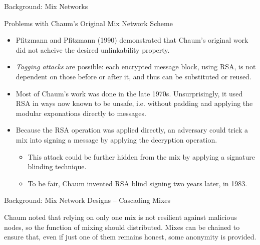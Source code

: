 \documentclass[9pt,a4paper,handout]{beamer}
\begin{document}
\begin{frame}{Background: Mix Networks}
  \begin{block}{Problems with Chaum's Original Mix Network Scheme}
    \begin{itemize}
      \item Pfitzmann and Pfitzmann (1990) demonstrated that Chaum's original
        work did not acheive the desired unlinkability property.
      \item<2-> \emph{Tagging attacks} are possible: each encrypted message block,
        using RSA, is not dependent on those before or after it, and thus can be
        substituted or reused.
      \item<3-> Most of Chaum's work was done in the late 1970s.
        Unsurprisingly, it used RSA in ways now known to be unsafe, i.e. without
        padding and applying the modular exponations directly to messages.
      \item<4-> Because the RSA operation was applied directly, an adversary
        could trick a mix into signing a message by applying the decryption
        operation.
        \begin{itemize}
          \item<5-> This attack could be further hidden from the mix by applying
            a signature blinding technique.
          \item<6-> To be fair, Chaum invented RSA blind signing two years later, in
            1983.
        \end{itemize}
    \end{itemize}
  \end{block}
\end{frame}


\begin{frame}{Background: Mix Network Designs -- Cascading Mixes}

  Chaum noted that relying on only one mix is not resilient against malicious
  nodes, so the function of mixing should distributed.  Mixes can be chained to
  ensure that, even if just one of them remains honest, some anonymity is
  provided.

\end{frame}
\end{document}

